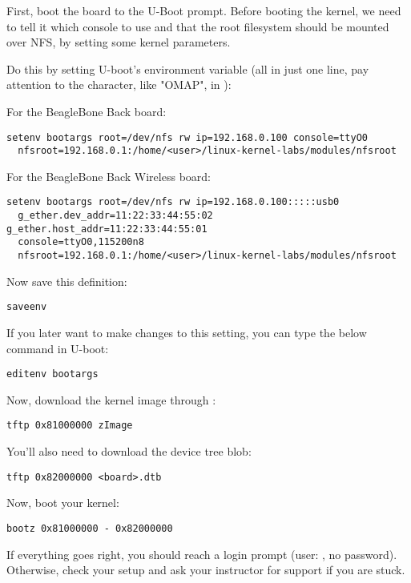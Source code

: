 First, boot the board to the U-Boot prompt. Before booting the kernel,
we need to tell it which console to use and that the root filesystem
should be mounted over NFS, by setting some kernel parameters.

Do this by setting U-boot's  environment variable (all in
just one line, pay attention to the  character, like "OMAP", in
):

For the BeagleBone Back board:
\begin{verbatim}
setenv bootargs root=/dev/nfs rw ip=192.168.0.100 console=ttyO0
  nfsroot=192.168.0.1:/home/<user>/linux-kernel-labs/modules/nfsroot
\end{verbatim}

For the BeagleBone Back Wireless board:
\begin{verbatim}
setenv bootargs root=/dev/nfs rw ip=192.168.0.100:::::usb0
  g_ether.dev_addr=11:22:33:44:55:02 g_ether.host_addr=11:22:33:44:55:01
  console=ttyO0,115200n8
  nfsroot=192.168.0.1:/home/<user>/linux-kernel-labs/modules/nfsroot
\end{verbatim}

Now save this definition:
\begin{verbatim}
saveenv
\end{verbatim}

If you later want to make changes to this setting, you can type the
below command in U-boot:

\begin{verbatim}
editenv bootargs
\end{verbatim}

Now, download the kernel image through :

\begin{verbatim}
tftp 0x81000000 zImage
\end{verbatim}

You'll also need to download the device tree blob:

\begin{verbatim}
tftp 0x82000000 <board>.dtb
\end{verbatim}

Now, boot your kernel:

\begin{verbatim}
bootz 0x81000000 - 0x82000000
\end{verbatim}

If everything goes right, you should reach a login prompt (user:
, no password). Otherwise, check your setup and
ask your instructor for support if you are stuck.

